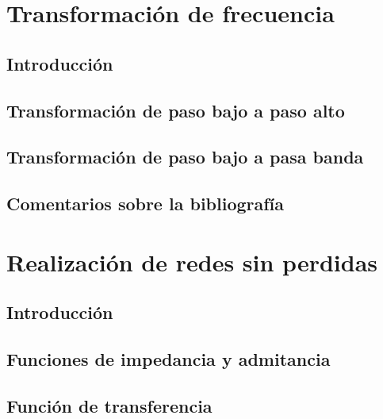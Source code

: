 \documentclass[oneside,a4paper,10pt]{scrbook}
\begin{document}
    \chapter{Transformación de frecuencia}
	{
		\section{Introducción}
   		{
    				
		}
		
		\clearpage	
		
		\section{Transformación de paso bajo a paso alto}
   		{
    				
		}
		
		\clearpage
		
		\section{Transformación de paso bajo a pasa banda}
   		{
    				
		}
		
		\clearpage
		
		\section{Comentarios sobre la bibliografía}
   		{
    						
		}		
		
	}
	
	\clearpage
	
    \chapter{Realización de redes sin perdidas}
    {
    
	    \section{Introducción}	
    		{
					 
		}
    	
    		\section{Funciones de impedancia y admitancia}	
    		{
    	
    		}
    		\newpage
    
		\section{Función de transferencia}	
		{
		}
	
		\newpage       
    }
    
\end{document}
